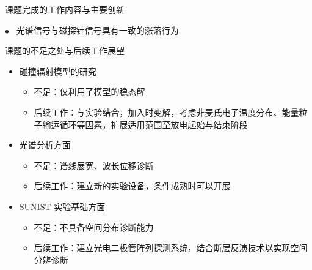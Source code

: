 \begin{CJK*}{UTF8}{kai}
\begin{frame}{课题完成的工作内容与主要创新}
\begin{itemize}
\begin{itemize}
\begin{itemize}
{							{\color{bulletcolor}\quad\tiny{}\hbox{{$\bullet$}}}~ 光谱信号与磁探针信号具有一致的涨落行为
						}
					\end{itemize}
			\end{itemize}
	\end{itemize}
\end{frame}

\begin{frame}{课题的不足之处与后续工作展望}
	\begin{itemize}
		\item 碰撞辐射模型的研究
			\begin{itemize}
				\item 不足：仅利用了模型的稳态解
				\item 后续工作：与实验结合，加入时变解，考虑非麦氏电子温度分布、能量粒子输运循环等因素，扩展适用范围至放电起始与结束阶段
			\end{itemize}
		\bigskip
		\item 光谱分析方面
			\begin{itemize}
				\item 不足：谱线展宽、波长位移诊断
				\item 后续工作：建立新的实验设备，条件成熟时可以开展
			\end{itemize}
		\bigskip
		\item SUNIST 实验基础方面
			\begin{itemize}
				\item 不足：不具备空间分布诊断能力
				\item 后续工作：建立光电二极管阵列探测系统，结合断层反演技术以实现空间分辨诊断%
			\end{itemize}
	\end{itemize}
\end{frame}


\end{CJK*}
